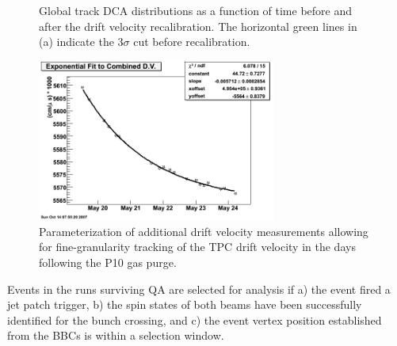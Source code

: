 \begin{figure}
  \caption{Global track DCA distributions as a function of time before and after the drift velocity recalibration.  The horizontal green lines in (a) indicate the 3$\sigma$ cut before recalibration.}
\end{figure}

\begin{figure}
  \centering
  \includegraphics[width=0.7\textwidth]{figures/dv-fit}
  \caption{Parameterization of additional drift velocity measurements allowing for fine-granularity tracking of the TPC drift velocity in the days following the P10 gas purge.}
  \label{fig:dv-fit}
\end{figure}

Events in the runs surviving QA are selected for analysis if a) the event fired
a jet patch trigger, b) the spin states of both beams have been successfully
identified for the bunch crossing, and c) the event vertex position established
from the BBCs is within a selection window.


